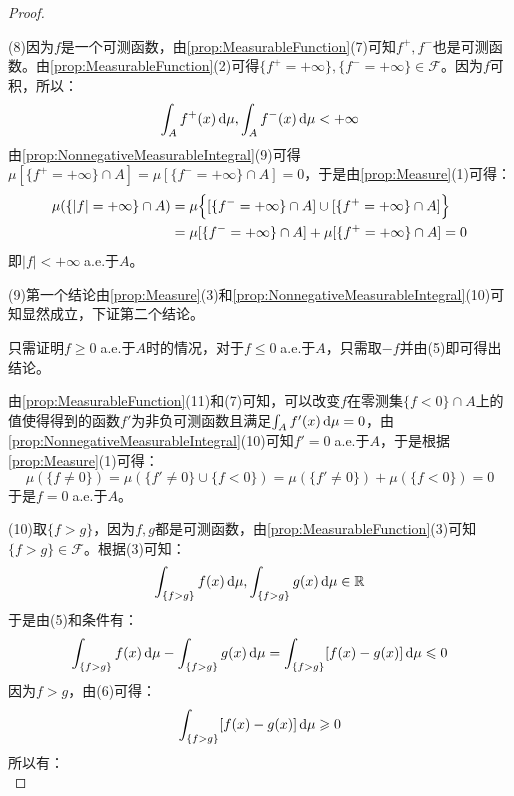 \begin{proof}
\begin{equation*}
	\end{equation*}\par
	(8)因为$f$是一个可测函数，由\cref{prop:MeasurableFunction}(7)可知$f^+,f^-$也是可测函数。由\cref{prop:MeasurableFunction}(2)可得$\{f^+=+\infty\},\{f^-=+\infty\}\in \mathscr{F}$。因为$f$可积，所以：
	\begin{equation*}
		\int_{A}f^+(x)\mathop{}\!\mathrm{d}\mu,\int_{A}f^-(x)\mathop{}\!\mathrm{d}\mu<+\infty
	\end{equation*}
	由\cref{prop:NonnegativeMeasurableIntegral}(9)可得$\mu[\{f^+=+\infty\}\cap A]=\mu[\{f^-=+\infty\}\cap A]=0$，于是由\cref{prop:Measure}(1)可得：
	\begin{align*}
		\mu(\{|f|=+\infty\}\cap A)&=\mu\Bigl\{[\{f^-=+\infty\}\cap A]\cup[\{f^+=+\infty\}\cap A]\Bigr\} \\
		&=\mu[\{f^-=+\infty\}\cap A]+\mu[\{f^+=+\infty\}\cap A]=0
	\end{align*}
	即$|f|<+\infty\;$a.e.于$A$。\par
	(9)第一个结论由\cref{prop:Measure}(3)和\cref{prop:NonnegativeMeasurableIntegral}(10)可知显然成立，下证第二个结论。\par
	只需证明$f\geqslant0\;$a.e.于$A$时的情况，对于$f\leqslant0\;$a.e.于$A$，只需取$-f$并由(5)即可得出结论。\par 
	由\cref{prop:MeasurableFunction}(11)和(7)可知，可以改变$f$在零测集$\{f<0\}\cap A$上的值使得得到的函数$f'$为非负可测函数且满足$\int_{A}f'(x)\mathop{}\!\mathrm{d}\mu=0$，由\cref{prop:NonnegativeMeasurableIntegral}(10)可知$f'=0\;$a.e.于$A$，于是根据\cref{prop:Measure}(1)可得：
	\begin{equation*}
		\mu(\{f\ne0\})=\mu(\{f'\ne0\}\cup\{f<0\})=\mu(\{f'\ne0\})+\mu(\{f<0\})=0
	\end{equation*}
	于是$f=0\;$a.e.于$A$。\par
	(10)取$\{f>g\}$，因为$f,g$都是可测函数，由\cref{prop:MeasurableFunction}(3)可知$\{f>g\}\in \mathscr{F}$。根据(3)可知：
	\begin{equation*}
		\int_{\{f>g\}}f(x)\mathop{}\!\mathrm{d}\mu,\int_{\{f>g\}}g(x)\mathop{}\!\mathrm{d}\mu\in\mathbb{R}
	\end{equation*}
	于是由(5)和条件有：
	\begin{equation*}
		\int_{\{f>g\}}f(x)\mathop{}\!\mathrm{d}\mu-\int_{\{f>g\}}g(x)\mathop{}\!\mathrm{d}\mu=\int_{\{f>g\}}[f(x)-g(x)]\mathop{}\!\mathrm{d}\mu\leqslant0
	\end{equation*}
	因为$f>g$，由(6)可得：
	\begin{equation*}
		\int_{\{f>g\}}[f(x)-g(x)]\mathop{}\!\mathrm{d}\mu\geqslant0
	\end{equation*}
	所以有：
	\begin{equation*}

\end{equation*}
\end{proof}
